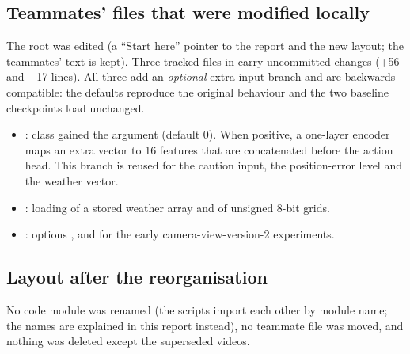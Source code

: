 \subsection{Teammates' files that were modified locally}
The root  was edited (a ``Start here'' pointer to the report and the new layout; the teammates' text is kept). Three tracked files in  carry uncommitted changes (+56 and $-$17 lines). All three add an \emph{optional} extra-input branch and are backwards compatible: the defaults reproduce the original behaviour and the two baseline checkpoints load unchanged.
\begin{itemize}
\item {}: class  gained the argument  (default 0). When positive, a one-layer encoder maps an extra vector to 16 features that are concatenated before the action head. This branch is reused for the caution input, the position-error level and the weather vector.
\item {}: loading of a stored weather array and of unsigned 8-bit grids.
\item {}: options ,  and  for the early camera-view-version-2 experiments.
\end{itemize}

\subsection{Layout after the reorganisation}\label{sec:cleanup}
No code module was renamed (the scripts import each other by module name; the names are explained in this report instead), no teammate file was moved, and nothing was deleted except the superseded videos.

